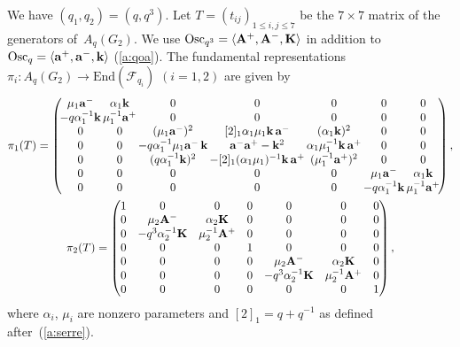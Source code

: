 \documentclass[pdftex]{sigma}
\begin{document}
We have $(q_1,q_2)=(q,q^3)$.
Let $T=(t_{ij})_{1\le i,j \le 7}$ be the
$7\times 7$ matrix of the generators of~$A_q(G_2)$.
We  use
$\mathrm{Osc}_{q^3} =
\langle  {\rm{\bf A}}^+, {\rm{\bf A}}^-, {\rm{\bf K}} \rangle$
in addition to
$\mathrm{Osc}_q =
\langle  {\rm{\bf a}}^+, {\rm{\bf a}}^-, {\rm{\bf k}} \rangle$
(\ref{a:qoa}).
The fundamental representations
$\pi_i: A_q(G_2) \rightarrow \mathrm{End}(\mathcal{F}_{q_i})$
$(i=1,2)$ are given by{\samepage
\begin{gather}
 \pi_1(T)=
 \left(\!
\begin{array}{@{}c@{\,}c@{\,}c@{\,}c@{\,}c@{\,}c@{\,}c@{}}
\mu_1 {\rm{\bf a}}^- & \alpha_1 {\rm{\bf k}} &  0 & 0 & 0 & 0 &0 \\
-q\alpha^{-1}_1{\rm{\bf k}} & \mu^{-1}_1{\rm{\bf a}}^+ & 0 & 0&0 & 0& 0\\
0&0 & (\mu_1{\rm{\bf a}}^-)^2 &
[2]_1\alpha_1\mu_1 {\rm{\bf k}}\, {\rm{\bf a}}^- & (\alpha_1{\rm{\bf k}})^2 & 0& 0\\
0 & 0& -q\alpha_1^{-1}\mu_1{\rm{\bf a}}^- \,{\rm{\bf k}} &
{\rm{\bf a}}^- {\rm{\bf a}}^+ - {\rm{\bf k}}^2 & \alpha_1\mu^{-1}_1{\rm{\bf k}}
\,{\rm{\bf a}}^+ & 0& 0\\
0& 0& (q\alpha_1^{-1}{\rm{\bf k}})^2 &
-[2]_1(\alpha_1\mu_1)^{-1} {\rm{\bf k}}
\,{\rm{\bf a}}^+ & (\mu_1^{-1}{\rm{\bf a}}^+)^2 & 0& 0\\
0&0&0&0&0& \mu_1{\rm{\bf a}}^- & \alpha_1{\rm{\bf k}} \\
0&0&0&0&0& -q\alpha_1^{-1}{\rm{\bf k}} & \mu_1^{-1}{\rm{\bf a}}^+
 \end{array}
\!\right)
 , \nonumber\\
\pi_2(T)=
\begin{pmatrix}
1&  0&  0& 0& 0& 0&0\\
 0& \mu_2{\rm{\bf A}}^- & \alpha_2 {\rm{\bf K}} &0 &0 &0 &0 \\
 0& -q^3\alpha_2^{-1} {\rm{\bf K}} & \mu_2^{-1} {\rm{\bf A}}^+ & 0& 0& 0&0\\
0 &0 & 0& 1& 0&0 &0\\
 0& 0& 0& 0& \mu_2 {\rm{\bf A}}^- & \alpha_2 {\rm{\bf K}} & 0\\
0 & 0& 0& 0& -q^3\alpha^{-1}_2 {\rm{\bf K}} & \mu_2^{-1} {\rm{\bf A}}^+ & 0\\
 0&0&0&0&0&0& 1
 \end{pmatrix},\label{a:piTg}
\end{gather}
where $\alpha_i$, $\mu_i$ are nonzero parameters
and $[2]_1=q+q^{-1}$ as def\/ined after~(\ref{a:serre}).}
\end{document}
